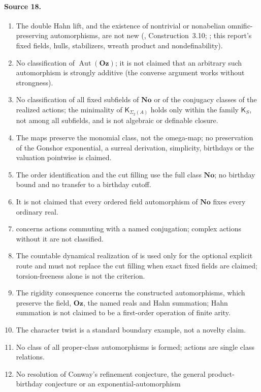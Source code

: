 \documentclass[11pt,oneside]{article}
\numberwithin{equation}{section}
\theoremstyle{definition}
\theoremstyle{remark}
\newcommand{\No}{\mathbf{No}}
\newcommand{\Oz}{\mathbf{Oz}}
\newcommand{\Aut}{\operatorname{Aut}}
\begin{document}
\paragraph{Source 18.}
\begin{enumerate}[itemsep=1pt]
\item The double Hahn lift, and the existence of nontrivial or nonabelian omnific-preserving automorphisms, are not new (\cite{KKS},
Construction~3.10; \cite{KS}; this report's fixed fields, hulls, stabilizers, wreath product and nondefinability).
\item No classification of $\Aut(\Oz)$; it is not claimed that an arbitrary such automorphism is strongly additive (the converse
argument works without strongness).
\item No classification of all fixed subfields of $\No$ or of the conjugacy classes of the realized actions; the minimality of
$\mathsf K_{\Sigma_2(A)}$ holds only within the family $\mathsf K_S$, not among all subfields, and is not algebraic or definable closure.
\item The maps preserve the monomial class, not the omega-map; no preservation of the Gonshor exponential, a surreal derivation,
simplicity, birthdays or the valuation pointwise is claimed.
\item The order identification and the cut filling use the full class $\No$; no birthday bound and no transfer to a birthday cutoff.
\item It is not claimed that every ordered field automorphism of $\No$ fixes every ordinary real.
\item {} concerns actions commuting with a named conjugation; complex actions without it are not classified.
\item The countable dynamical realization of \cite{Rivas} is used only for the optional explicit route and must not replace the cut
filling when exact fixed fields are claimed; torsion-freeness alone is not the criterion.
\item The rigidity consequence concerns the constructed automorphisms, which preserve the field, $\Oz$, the named reals and Hahn
summation; Hahn summation is not claimed to be a first-order operation of finite arity.
\item The character twist is a standard boundary example, not a novelty claim.
\item No class of all proper-class automorphisms is formed; actions are single class relations.
\item No resolution of Conway's refinement conjecture, the general product-birthday conjecture or an exponential-automorphism

\end{enumerate}
\end{document}
